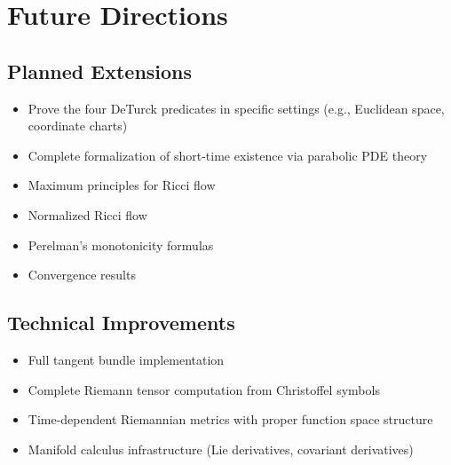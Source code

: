 \chapter{Future Directions}

\section{Planned Extensions}

\begin{itemize}
\item Prove the four DeTurck predicates in specific settings (e.g., Euclidean space, coordinate charts)
\item Complete formalization of short-time existence via parabolic PDE theory
\item Maximum principles for Ricci flow
\item Normalized Ricci flow
\item Perelman's monotonicity formulas
\item Convergence results
\end{itemize}

\section{Technical Improvements}

\begin{itemize}
\item Full tangent bundle implementation
\item Complete Riemann tensor computation from Christoffel symbols
\item Time-dependent Riemannian metrics with proper function space structure
\item Manifold calculus infrastructure (Lie derivatives, covariant derivatives)
\end{itemize}
